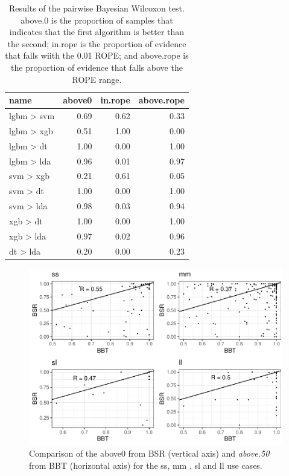 \documentclass[twoside,11pt,preprint]{article}
\begin{document}
\begin{table}

\caption{\label{tab:xpairbays1}\label{tab:pairbays1}Results of the pairwise Bayesian Wilcoxon test. above.0 is the proportion of samples that indicates that the first algorithm is better than the second; in.rope is the proportion of evidence that falls wiith the 0.01 ROPE; and above.rope is the proportion of evidence that falls above the ROPE range.}
\centering
\begin{tabular}[t]{lrrr}
\toprule
\textbf{name} & \textbf{above0} & \textbf{in.rope} & \textbf{above.rope}\\
\midrule
lgbm > svm & 0.69 & 0.62 & 0.33\\
lgbm > xgb & 0.51 & 1.00 & 0.00\\
lgbm > dt & 1.00 & 0.00 & 1.00\\
lgbm > lda & 0.96 & 0.01 & 0.97\\
svm > xgb & 0.21 & 0.61 & 0.05\\
\addlinespace
svm > dt & 1.00 & 0.00 & 1.00\\
svm > lda & 0.98 & 0.03 & 0.94\\
xgb > dt & 1.00 & 0.00 & 1.00\\
xgb > lda & 0.97 & 0.02 & 0.96\\
dt > lda & 0.20 & 0.00 & 0.23\\
\bottomrule
\end{tabular}
\end{table}

\begin{figure}
\includegraphics[width=0.9\linewidth]{figure-latex/bsr1-1} \caption{\label{fig:bsr}Comparison of the above0 from BSR (vertical axis) and {\em above.50} from BBT  (horizontal axis) for the ss, mm , sl and ll use cases.}\label{fig:bsr1}
\end{figure}
\end{document}

